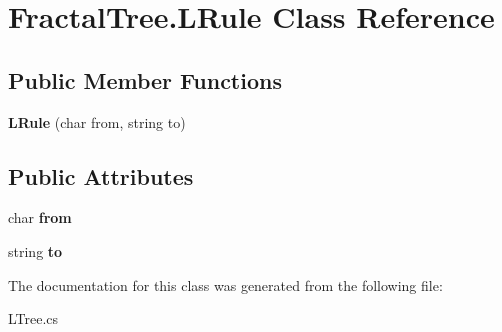 \hypertarget{class_fractal_tree_1_1_l_rule}{}\section{Fractal\+Tree.\+L\+Rule Class Reference}
\label{class_fractal_tree_1_1_l_rule}
\subsection*{Public Member Functions}
\begin{DoxyCompactItemize}
\item 
\hypertarget{class_fractal_tree_1_1_l_rule_a35f380166641f36ee4290895cecc4583}{}\label{class_fractal_tree_1_1_l_rule_a35f380166641f36ee4290895cecc4583} 
{\bfseries L\+Rule} (char from, string to)
\end{DoxyCompactItemize}
\subsection*{Public Attributes}
\begin{DoxyCompactItemize}
\item 
\hypertarget{class_fractal_tree_1_1_l_rule_aa08500e91663051c5da038421de7a5d5}{}\label{class_fractal_tree_1_1_l_rule_aa08500e91663051c5da038421de7a5d5} 
char {\bfseries from}
\item 
\hypertarget{class_fractal_tree_1_1_l_rule_aaa28686eef06632f5c6b0d71ff7c615e}{}\label{class_fractal_tree_1_1_l_rule_aaa28686eef06632f5c6b0d71ff7c615e} 
string {\bfseries to}
\end{DoxyCompactItemize}


The documentation for this class was generated from the following file\+:\begin{DoxyCompactItemize}
\item 
L\+Tree.\+cs\end{DoxyCompactItemize}
